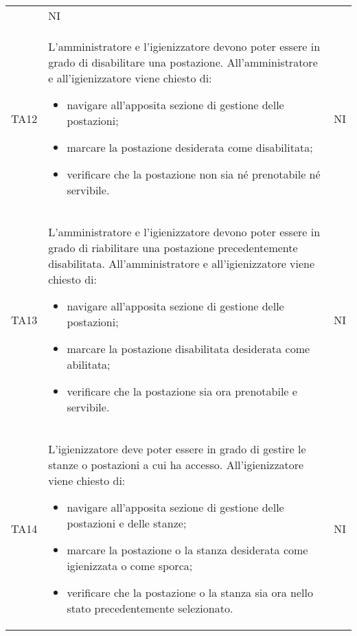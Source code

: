 {\begin{longtable}{ c C{11cm} c }
\begin{itemize}
        \end{itemize}&
        NI\\
        TA12&
        L'amministratore e l'igienizzatore devono poter essere in grado di disabilitare una postazione.\newline
        All'amministratore e all'igienizzatore viene chiesto di:
        \begin{itemize}
            \item navigare all'apposita sezione di gestione delle postazioni;
            \item marcare la postazione desiderata come disabilitata;
            \item verificare che la postazione non sia né prenotabile né servibile.
        \end{itemize}&
        NI\\
        TA13&
        L'amministratore e l'igienizzatore devono poter essere in grado di riabilitare una postazione precedentemente disabilitata.\newline
        All'amministratore e all'igienizzatore viene chiesto di:
        \begin{itemize}
            \item navigare all'apposita sezione di gestione delle postazioni;
            \item marcare la postazione disabilitata desiderata come abilitata;
            \item verificare che la postazione sia ora prenotabile e servibile.
        \end{itemize}&
        NI\\
        TA14&
        L'igienizzatore deve poter essere in grado di gestire le stanze o postazioni a cui ha accesso.\newline
        All'igienizzatore viene chiesto di:
        \begin{itemize}
            \item navigare all'apposita sezione di gestione delle postazioni e delle stanze;
            \item marcare la postazione o la stanza desiderata come igienizzata o come sporca;
            \item verificare che la postazione o la stanza sia ora nello stato precedentemente selezionato.
        \end{itemize}&
        NI\\
        
        
    \end{longtable}
}